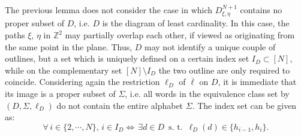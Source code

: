 \documentclass{article}
\begin{document}
The previous lemma does not consider the case in which $D^{N+1}_{\xi, \eta}$ contains no proper subset of $D$, i.e. $D$ is the diagram of least cardinality. In this case, the paths $\xi,\, \eta$ in $\mathbb{Z}^2$ may partially overlap each other, if viewed as originating from the same point in the plane. Thus, $D$ may not identify a unique couple of outlines, but a set which is uniquely defined on a certain index set $I_D\subset[N]$, while on the complementary set $[N]\setminus I_D$ the two outline are only required to coincide. Considering again the restriction $\ell_D$ of $\overline{\ell}$ on $D$, it is immediate that its image is a proper subset of $\Sigma$, i.e. all words in the equivalence class set by $(D,\Sigma,\ell_D)$ do not contain the entire alphabet $\Sigma$.  The index set can be given as:
\begin{equation}
    \label{index set}
    \forall\,i\in\{2,\cdots,N\},\,i\in I_D\Leftrightarrow\,\exists d\in D \,\text{ s. t. }\,\ell_D(d)\in\{h_{i-1},h_i\}.
\end{equation}
\end{document}
